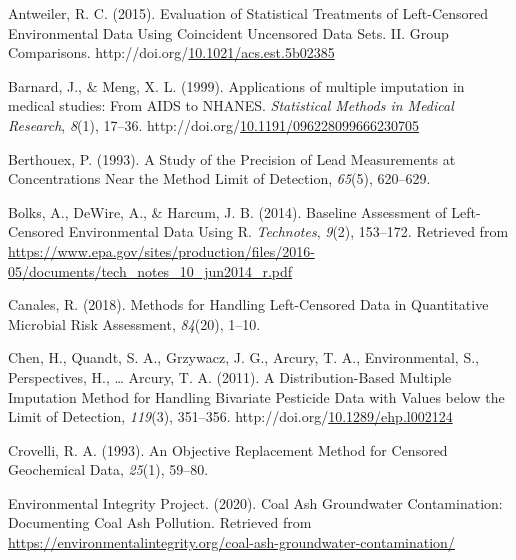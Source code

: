 \documentclass[12pt, twoside]{amherstthesis}
\newenvironment{CSLReferences}%
  {}%
  {\par}
\begin{document}
\noindent

\setlength{\parindent}{-0.20in}
\setlength{\leftskip}{0.20in}
\setlength{\parskip}{8pt}

\hypertarget{refs}{}
\begin{CSLReferences}{1}{0}
\leavevmode\hypertarget{ref-Antweiler2015}{}%
Antweiler, R. C. (2015). {Evaluation of Statistical Treatments of Left-Censored Environmental Data Using Coincident Uncensored Data Sets. II. Group Comparisons}. http://doi.org/\href{https://doi.org/10.1021/acs.est.5b02385}{10.1021/acs.est.5b02385}

\leavevmode\hypertarget{ref-Barnard1999}{}%
Barnard, J., \& Meng, X. L. (1999). {Applications of multiple imputation in medical studies: From AIDS to NHANES}. \emph{Statistical Methods in Medical Research}, \emph{8}(1), 17--36. http://doi.org/\href{https://doi.org/10.1191/096228099666230705}{10.1191/096228099666230705}

\leavevmode\hypertarget{ref-Berthouex1993}{}%
Berthouex, P. (1993). {A Study of the Precision of Lead Measurements at Concentrations Near the Method Limit of Detection}, \emph{65}(5), 620--629.

\leavevmode\hypertarget{ref-Bolks2014}{}%
Bolks, A., DeWire, A., \& Harcum, J. B. (2014). {Baseline Assessment of Left-Censored Environmental Data Using R}. \emph{Technotes}, \emph{9}(2), 153--172. Retrieved from \url{https://www.epa.gov/sites/production/files/2016-05/documents/tech_notes_10_jun2014_r.pdf}

\leavevmode\hypertarget{ref-Canales2018}{}%
Canales, R. (2018). {Methods for Handling Left-Censored Data in Quantitative Microbial Risk Assessment}, \emph{84}(20), 1--10.

\leavevmode\hypertarget{ref-Chen2011}{}%
Chen, H., Quandt, S. A., Grzywacz, J. G., Arcury, T. A., Environmental, S., Perspectives, H., \ldots{} Arcury, T. A. (2011). {A Distribution-Based Multiple Imputation Method for Handling Bivariate Pesticide Data with Values below the Limit of Detection}, \emph{119}(3), 351--356. http://doi.org/\href{https://doi.org/10.1289/ehp.l002124}{10.1289/ehp.l002124}

\leavevmode\hypertarget{ref-Crovelli1993}{}%
Crovelli, R. A. (1993). {An Objective Replacement Method for Censored Geochemical Data}, \emph{25}(1), 59--80.

\leavevmode\hypertarget{ref-EIP2020}{}%
Environmental Integrity Project. (2020). {Coal Ash Groundwater Contamination: Documenting Coal Ash Pollution}. Retrieved from \url{https://environmentalintegrity.org/coal-ash-groundwater-contamination/}


\end{CSLReferences}
\end{document}
